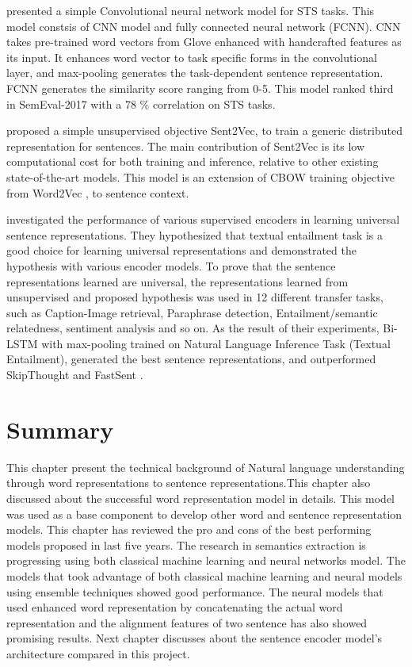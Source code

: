 \documentclass[12pt]{report} %
\begin{document}
\cite{shao2017hcti} presented a simple Convolutional neural network model for STS tasks. This model constsis of CNN model and fully connected neural network (FCNN). CNN takes pre-trained word vectors from Glove \citep{pennington2014glove} enhanced with handcrafted features as its input. It enhances word vector to task specific forms in the convolutional layer, and max-pooling generates the task-dependent sentence representation. FCNN generates the similarity score ranging from 0-5. This model ranked third in SemEval-2017 with a 78 \% correlation on STS tasks. 


\cite{pagliardini2017unsupervised} proposed a simple unsupervised objective Sent2Vec, to train a generic distributed representation for sentences. The main contribution of Sent2Vec is its low computational cost for both training and inference, relative to other existing state-of-the-art models. This model is an extension of CBOW training objective from Word2Vec \citep{mikolov2014word2vec}, to sentence context.


\cite{conneau2017supervised} investigated the performance of various supervised encoders in learning universal sentence representations. They hypothesized that textual entailment task is a good choice for learning universal representations and demonstrated the hypothesis with various encoder models. To prove that the sentence representations learned are universal, the representations learned from unsupervised and proposed hypothesis was used in 12 different transfer tasks, such as Caption-Image retrieval, Paraphrase detection, Entailment/semantic relatedness, sentiment analysis and so on. As the result of their experiments, Bi-LSTM with max-pooling trained on Natural Language Inference Task (Textual Entailment), generated the best sentence representations, and outperformed SkipThought \citep{kiros2015skip} and FastSent \citep{hill2016learning}.

\section{Summary}

This chapter present the technical background of Natural language understanding through word representations to sentence representations.This chapter also discussed about the successful word representation model in details. This model was used as a base component to develop other word and sentence representation models. This chapter has reviewed the pro and cons of the best performing models proposed in last five years. The research in semantics extraction is progressing using both classical machine learning and neural networks model. The models that took advantage of both classical machine learning and neural models using ensemble techniques showed good performance. The neural models that used enhanced word representation by concatenating the actual word representation and the alignment features of two sentence has also showed promising results. Next chapter discusses about the sentence encoder model's architecture compared in this project.
\end{document}
